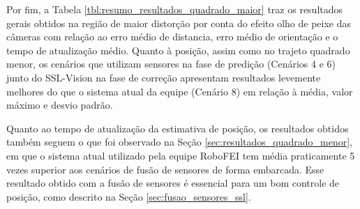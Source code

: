 \documentclass[acronym, symbols, table, deposito]{fei}
\begin{document}
		Por fim, a Tabela \ref{tbl:resumo_resultados_quadrado_maior} traz os resultados gerais obtidos na região de maior distorção por conta do efeito olho de peixe das câmeras com relação ao erro médio de distancia, erro médio de orientação e o tempo de atualização médio. Quanto à posição, assim como no trajeto quadrado menor, os cenários que utilizam sensores na fase de predição (Cenários 4 e 6) junto do SSL-Vision na fase de correção apresentam resultados levemente melhores do que o sistema atual da equipe (Cenário 8) em relação à média, valor máximo e desvio padrão.
		
		Quanto ao tempo de atualização da estimativa de posição, os resultados obtidos também seguem o que foi observado na Seção \ref{sec:resultados_quadrado_menor}, em que o sistema atual utilizado pela equipe RoboFEI tem média praticamente 5 vezes superior aos cenários de fusão de sensores de forma embarcada. Esse resultado obtido com a fusão de sensores é essencial para um bom controle de posição, como descrito na Seção \ref{sec:fusao_sensores_ssl}.
	
\end{document}

